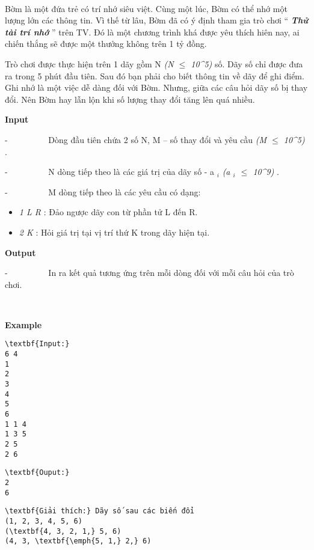 

 

Bờm là một đứa trẻ có trí nhớ siêu việt. Cùng một lúc, Bờm có thể nhớ một lượng lớn các thông tin. Vì thế từ lâu, Bờm đã có ý định tham gia trò chơi “ \emph{\textbf{ Thử tài trí nhớ }} ” trên TV. Đó là một chương trình khá được yêu thích hiên nay, ai chiến thắng sẽ được một thưởng không trên 1 tỷ đồng.

Trò chơi được thực hiện trên 1 dãy gồm N \emph{ (N $\le$ 10^5) } số. Dãy số chỉ được đưa ra trong 5 phút đầu tiên. Sau đó bạn phải cho biết thông tin về dãy để ghi điểm. Ghi nhớ là một việc dễ dàng đối với Bờm. Nhưng, giữa các câu hỏi dãy số bị thay đổi. Nên Bờm hay lẫn lộn khi số lượng thay đổi tăng lên quá nhiều.

\textbf{Input }

-          Dòng đầu tiên chứa 2 số N, M – số thay đổi và yêu cầu \emph{ (M  $\le$  10^5) } .

-          N dòng tiếp theo là các giá trị của dãy số - a $_ i $\emph{ (a $_ i $  $\le$  10^9) } .

-          M dòng tiếp theo là các yêu cầu có dạng:
\begin{itemize}
	\item \emph{1 L R } : Đảo ngược dãy con từ phần tử L đến R.
	\item \emph{2 K } : Hỏi giá trị tại vị trí thứ K trong dãy hiện tại.
\end{itemize}

\textbf{Output }

-          In ra kết quả tương ứng trên mỗi dòng đối với mỗi câu hỏi của trò chơi.

 

\textbf{Example }
\begin{verbatim}
\textbf{Input:}
6 4
1
2
3
4
5
6
1 1 4
1 3 5
2 5
2 6
\end{verbatim}
\begin{verbatim}
\textbf{Ouput:}
2
6\end{verbatim}
\begin{verbatim}
\textbf{Giải thích:} Dãy số sau các biến đổi
(1, 2, 3, 4, 5, 6)
(\textbf{4, 3, 2, 1,} 5, 6)
(4, 3, \textbf{\emph{5, 1,} 2,} 6)\end{verbatim}

